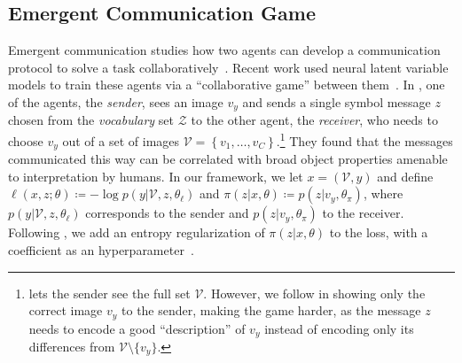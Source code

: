 \subsection{Emergent Communication Game}\label{sec:comm}

\noindent Emergent communication studies how two agents can develop a
communication protocol to solve a task
collaboratively~\citep{kirby2002natural}. Recent work used neural
latent variable models to train these agents via a ``collaborative
game'' between
them~\citep{lewis1969convention,Lazaridou2017,Havrylov2017,
    jorge2016learning, foerster2016learning, sukhbaatar2016learning}. In
\citet{Lazaridou2017}, one of the agents, the \emph{sender}, sees an
image $v_y$ and sends a single symbol message $z$ chosen from the \emph{vocabulary} set
$\mathcal{Z}$ to the other agent, the
\emph{receiver}, who needs to choose $v_y$ out of
a set of images $\mathcal{V} = \left\{ v_1, \dots, v_C
    \right\}$.\footnote{\citet{Lazaridou2017} lets the sender see the
    full set $\mathcal{V}$. However, we follow \citet{Havrylov2017}
    in showing only the correct image $v_y$ to the sender, making the
    game harder, as the message $z$ needs to encode a good
    ``description'' of $v_y$ instead of encoding only
    its differences from $\mathcal{V}\setminus \{v_y\}$.} They found that
the messages communicated this way can be correlated with broad
object properties amenable to interpretation by humans. In our
framework, we let $x = (\mathcal{V}, y)$ and define $\ell (x, z;
    \theta) \coloneqq -\log p(y |\mathcal{V}, z, \theta_\ell)$ and
$\pi (z |x, \theta) \coloneqq p(z |v_y, \theta_\pi)$, where
$p(y |\mathcal{V}, z, \theta_\ell)$ corresponds to the sender and
$p(z |v_y, \theta_\pi)$ to the receiver. Following
\citet{Lazaridou2017}, we add an entropy regularization of $\pi (z
    |x, \theta)$ to the loss, with a coefficient as an
hyperparameter~\citep{Mnih2016}.

